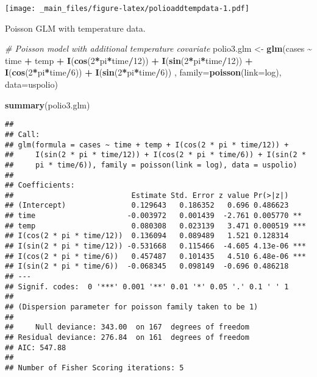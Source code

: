 \documentclass[
  12pt,
]{book}
\newenvironment{Shaded}{\begin{snugshade}}{\end{snugshade}}
\newcommand{\AttributeTok}[1]{\textcolor[rgb]{0.13,0.29,0.53}{#1}}
\newcommand{\CommentTok}[1]{\textcolor[rgb]{0.56,0.35,0.01}{\textit{#1}}}
\newcommand{\DecValTok}[1]{\textcolor[rgb]{0.00,0.00,0.81}{#1}}
\newcommand{\FunctionTok}[1]{\textcolor[rgb]{0.13,0.29,0.53}{\textbf{#1}}}
\newcommand{\NormalTok}[1]{#1}
\newcommand{\OtherTok}[1]{\textcolor[rgb]{0.56,0.35,0.01}{#1}}
\newcommand{\SpecialCharTok}[1]{\textcolor[rgb]{0.81,0.36,0.00}{\textbf{#1}}}
\begin{document}
\texttt{[image: \_main\_files/figure-latex/polioaddtempdata-1.pdf]}

Poisson GLM with temperature data.

\begin{Shaded}
\begin{Highlighting}[]
\CommentTok{\# Poisson model with additional temperature covariate}
\NormalTok{polio3.glm }\OtherTok{\textless{}{-}} \FunctionTok{glm}\NormalTok{(cases }\SpecialCharTok{\textasciitilde{}}\NormalTok{ time }\SpecialCharTok{+}\NormalTok{ temp }\SpecialCharTok{+} \FunctionTok{I}\NormalTok{(}\FunctionTok{cos}\NormalTok{(}\DecValTok{2}\SpecialCharTok{*}\NormalTok{pi}\SpecialCharTok{*}\NormalTok{time}\SpecialCharTok{/}\DecValTok{12}\NormalTok{)) }\SpecialCharTok{+} \FunctionTok{I}\NormalTok{(}\FunctionTok{sin}\NormalTok{(}\DecValTok{2}\SpecialCharTok{*}\NormalTok{pi}\SpecialCharTok{*}\NormalTok{time}\SpecialCharTok{/}\DecValTok{12}\NormalTok{))}
\SpecialCharTok{+} \FunctionTok{I}\NormalTok{(}\FunctionTok{cos}\NormalTok{(}\DecValTok{2}\SpecialCharTok{*}\NormalTok{pi}\SpecialCharTok{*}\NormalTok{time}\SpecialCharTok{/}\DecValTok{6}\NormalTok{)) }\SpecialCharTok{+} \FunctionTok{I}\NormalTok{(}\FunctionTok{sin}\NormalTok{(}\DecValTok{2}\SpecialCharTok{*}\NormalTok{pi}\SpecialCharTok{*}\NormalTok{time}\SpecialCharTok{/}\DecValTok{6}\NormalTok{)) , }\AttributeTok{family=}\FunctionTok{poisson}\NormalTok{(}\AttributeTok{link=}\NormalTok{log),}
\AttributeTok{data=}\NormalTok{uspolio)}

\FunctionTok{summary}\NormalTok{(polio3.glm)}
\end{Highlighting}
\end{Shaded}

\begin{verbatim}
## 
## Call:
## glm(formula = cases ~ time + temp + I(cos(2 * pi * time/12)) + 
##     I(sin(2 * pi * time/12)) + I(cos(2 * pi * time/6)) + I(sin(2 * 
##     pi * time/6)), family = poisson(link = log), data = uspolio)
## 
## Coefficients:
##                           Estimate Std. Error z value Pr(>|z|)    
## (Intercept)               0.129643   0.186352   0.696 0.486623    
## time                     -0.003972   0.001439  -2.761 0.005770 ** 
## temp                      0.080308   0.023139   3.471 0.000519 ***
## I(cos(2 * pi * time/12))  0.136094   0.089489   1.521 0.128314    
## I(sin(2 * pi * time/12)) -0.531668   0.115466  -4.605 4.13e-06 ***
## I(cos(2 * pi * time/6))   0.457487   0.101435   4.510 6.48e-06 ***
## I(sin(2 * pi * time/6))  -0.068345   0.098149  -0.696 0.486218    
## ---
## Signif. codes:  0 '***' 0.001 '**' 0.01 '*' 0.05 '.' 0.1 ' ' 1
## 
## (Dispersion parameter for poisson family taken to be 1)
## 
##     Null deviance: 343.00  on 167  degrees of freedom
## Residual deviance: 276.84  on 161  degrees of freedom
## AIC: 547.88
## 
## Number of Fisher Scoring iterations: 5
\end{verbatim}
\end{document}
